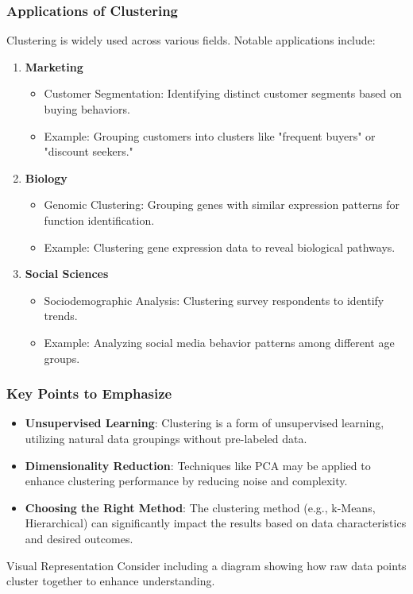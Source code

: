 \documentclass[aspectratio=169]{beamer}
\begin{document}
\begin{frame}[fragile]
    \frametitle{Applications of Clustering}
    Clustering is widely used across various fields. Notable applications include:
    
    \begin{enumerate}
        \item \textbf{Marketing}
        \begin{itemize}
            \item Customer Segmentation: Identifying distinct customer segments based on buying behaviors.
            \item Example: Grouping customers into clusters like "frequent buyers" or "discount seekers."
        \end{itemize}
        
        \item \textbf{Biology}
        \begin{itemize}
            \item Genomic Clustering: Grouping genes with similar expression patterns for function identification.
            \item Example: Clustering gene expression data to reveal biological pathways.
        \end{itemize}
        
        \item \textbf{Social Sciences}
        \begin{itemize}
            \item Sociodemographic Analysis: Clustering survey respondents to identify trends.
            \item Example: Analyzing social media behavior patterns among different age groups.
        \end{itemize}
    \end{enumerate}
\end{frame}

\begin{frame}[fragile]
    \frametitle{Key Points to Emphasize}
    \begin{itemize}
        \item \textbf{Unsupervised Learning}: Clustering is a form of unsupervised learning, utilizing natural data groupings without pre-labeled data.
        \item \textbf{Dimensionality Reduction}: Techniques like PCA may be applied to enhance clustering performance by reducing noise and complexity.
        \item \textbf{Choosing the Right Method}: The clustering method (e.g., k-Means, Hierarchical) can significantly impact the results based on data characteristics and desired outcomes.
    \end{itemize}
    \begin{block}{Visual Representation}
        Consider including a diagram showing how raw data points cluster together to enhance understanding.
    \end{block}
\end{frame}
\end{document}
